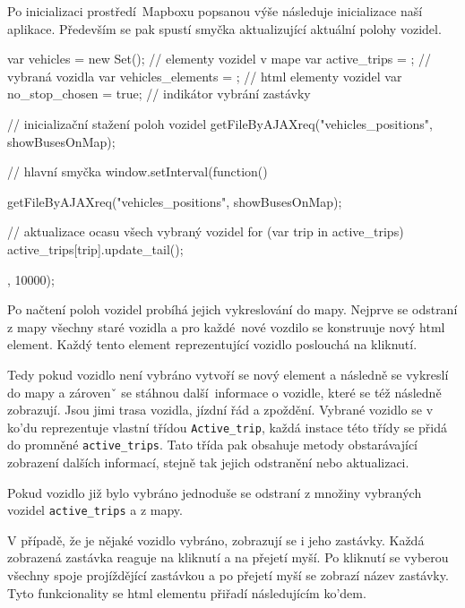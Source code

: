 \bigbreak

Po inicializaci prostředí Mapboxu popsanou výše následuje inicializace naší aplikace. Především se pak spustí smyčka aktualizující aktuální polohy vozidel.

\begin{code}[frame=none]
var vehicles = new Set(); // elementy vozidel v mape
var active_trips = {}; // vybraná vozidla
var vehicles_elements = {}; // html elementy vozidel
var no_stop_chosen = true; // indikátor vybrání zastávky

// inicializační stažení poloh vozidel
getFileByAJAXreq("vehicles_positions", showBusesOnMap);

// hlavní smyčka
window.setInterval(function(){
getFileByAJAXreq("vehicles_positions", showBusesOnMap);

// aktualizace ocasu všech vybraný vozidel
for (var trip in active_trips){
  active_trips[trip].update_tail();
}
}, 10000);
\end{code}

Po načtení poloh vozidel probíhá jejich vykreslování do mapy. Nejprve se odstraní z mapy všechny staré vozidla a pro každé nové vozdilo se konstruuje nový \gls{html} element. Každý tento element reprezentující vozidlo poslouchá na kliknutí.

\bigbreak

Tedy pokud vozidlo není vybráno vytvoří se nový element a následně se vykreslí do mapy a zárovenˇ se stáhnou další informace o vozidle, které se též následně zobrazují. Jsou jimi trasa vozidla, jízdní řád a zpoždění. Vybrané vozidlo se v ko'du reprezentuje vlastní třídou \verb-Active_trip-, každá instace této třídy se přidá do promněné \verb-active_trips-. Tato třída pak obsahuje metody obstarávající zobrazení dalších informací, stejně tak jejich odstranění nebo aktualizaci.

\bigbreak

Pokud vozidlo již bylo vybráno jednoduše se odstraní z množiny vybraných vozidel \verb-active_trips- a z mapy.

\bigbreak

V případě, že je nějaké vozidlo vybráno, zobrazují se i jeho zastávky. Každá zobrazená zastávka reaguje na kliknutí a na přejetí myší. Po kliknutí se vyberou všechny spoje projíždějící zastávkou a po přejetí myší se zobrazí název zastávky. Tyto funkcionality se \gls{html} elementu přiřadí následujícím ko'dem.

